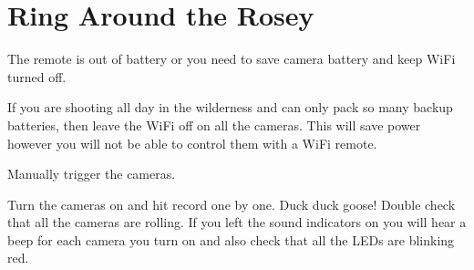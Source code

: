 \chapter{Ring Around the Rosey}
\pagecolor{white}
\label{chap:21}
\begin{fullwidth}


\problem

{\large The remote is out of battery or you need to save camera battery and keep WiFi turned off. \par}

If you are shooting all day in the wilderness and can only pack so many backup batteries, then leave the WiFi off on all the cameras. This will save power however you will not be able to control them with a WiFi remote. 


\solution

{\large Manually trigger the cameras. \par}

Turn the cameras on and hit record one by one. Duck duck goose! Double check that all the cameras are rolling. If you left the sound indicators on you will hear a beep for each camera you turn on and also check that all the LEDs are blinking red. 


\clearpage
\end{fullwidth}
